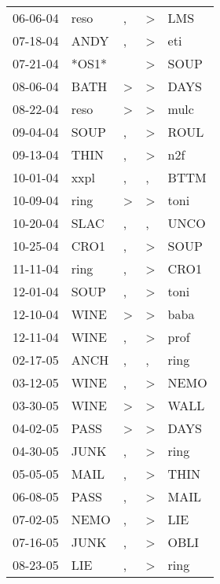 \begin{supertabular}{lllll}
 06-06-04 &   reso &                , &     \textgreater &   LMS \\
 07-18-04 &   ANDY &                , &     \textgreater &   eti \\
 07-21-04 &  *OS1* &                  &     \textgreater &  SOUP \\
 08-06-04 &   BATH &     \textgreater &     \textgreater &  DAYS \\
 08-22-04 &   reso &     \textgreater &     \textgreater &  mulc \\
 09-04-04 &   SOUP &                , &     \textgreater &  ROUL \\
 09-13-04 &   THIN &                , &     \textgreater &   n2f \\
 10-01-04 &   xxpl &                , &                , &  BTTM \\
 10-09-04 &   ring &     \textgreater &     \textgreater &  toni \\
 10-20-04 &   SLAC &                , &                , &  UNCO \\
 10-25-04 &   CRO1 &                , &     \textgreater &  SOUP \\
 11-11-04 &   ring &                , &     \textgreater &  CRO1 \\
 12-01-04 &   SOUP &                , &     \textgreater &  toni \\
 12-10-04 &   WINE &     \textgreater &     \textgreater &  baba \\
 12-11-04 &   WINE &                , &     \textgreater &  prof \\
 02-17-05 &   ANCH &                , &                , &  ring \\
 03-12-05 &   WINE &                , &     \textgreater &  NEMO \\
 03-30-05 &   WINE &     \textgreater &     \textgreater &  WALL \\
 04-02-05 &   PASS &     \textgreater &     \textgreater &  DAYS \\
 04-30-05 &   JUNK &                , &     \textgreater &  ring \\
 05-05-05 &   MAIL &                , &     \textgreater &  THIN \\
 06-08-05 &   PASS &                , &     \textgreater &  MAIL \\
 07-02-05 &   NEMO &                , &     \textgreater &   LIE \\
 07-16-05 &   JUNK &                , &     \textgreater &  OBLI \\
 08-23-05 &    LIE &                , &     \textgreater &  ring \\

\end{supertabular}
